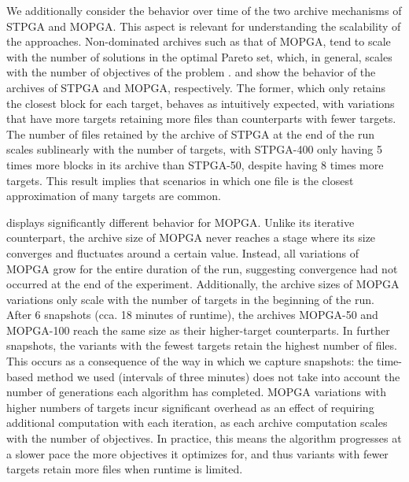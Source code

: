 We additionally consider the behavior over time of the two archive
mechanisms of \gls{STPGA} and \gls{MOPGA}.
This aspect is relevant for understanding the scalability of
the approaches.
Non-dominated archives such as that of \gls{MOPGA}, tend
to scale with the number of solutions in the optimal Pareto set,
which, in general, scales with the number of objectives of the problem \cite{luong2012elitist}.
 and  show the behavior of the
archives of \gls{STPGA} and \gls{MOPGA}, respectively.
The former, which only retains the closest block for each target,
behaves as intuitively expected, with variations that have more targets
retaining more files than counterparts with fewer targets.
The number of files retained by the archive of \gls{STPGA} at the end
of the run scales sublinearly with the number of targets,
with \gls{STPGA}-400 only having 5 times more blocks in its archive
than \gls{STPGA}-50, despite having 8 times more targets.
This result implies that scenarios in which one file is the closest approximation
of many targets are common.

 displays significantly different behavior for \gls{MOPGA}.
Unlike its iterative counterpart, the archive size of \gls{MOPGA} never reaches a stage
where its size converges and fluctuates around a certain value.
Instead, all variations of \gls{MOPGA} grow for the entire duration
of the run, suggesting convergence had not occurred at the end of the experiment.
Additionally, the archive sizes of \gls{MOPGA} variations only scale with the number
of targets in the beginning of the run.
After 6 snapshots (cca. 18 minutes of runtime),
the archives \gls{MOPGA}-50 and \gls{MOPGA}-100 reach the
same size as their higher-target counterparts.
In further snapshots, the variants with the fewest targets
retain the highest number of files.
This occurs as a consequence of the way in which we capture snapshots:
the time-based method we used (intervals of three minutes) does not
take into account the number of generations each algorithm has completed.
\gls{MOPGA} variations with higher numbers of targets incur 
significant overhead as an effect of requiring additional computation with
each iteration, as each archive computation
scales with the number of objectives.
In practice, this means the algorithm progresses at a slower pace
the more objectives it optimizes for, and thus
variants with fewer targets retain more files when runtime is limited.

